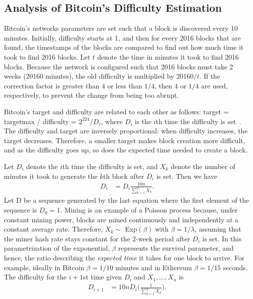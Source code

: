 \subsection{Analysis of Bitcoin's Difficulty Estimation}
 Bitcoin's networks parameters are set such that a block is discovered every 10 minutes. Initially, difficulty starts at 1, and then for every 2016 blocks that are found, the timestamps of the blocks are compared to find out how much time it took to find 2016 blocks. Let $t$ denote the time in minutes it took to find 2016 blocks. Because the network is configured such that 2016 blocks must take 2 weeks (20160 minutes), the old difficulty is multiplied by $20160 / t$. If the correction factor is greater than $4$ or less than $1/4$, then $4$ or $1/4$ are used, respectively, to prevent the change from being too abrupt.
\par \noindent Bitcoin's target and difficulty are related to each other as follows: target = targetmax / difficulty = $2^{224}/{D_i}$, where $D_i$ is the $i$th time the difficulty is set~\cite{bitcoin:difficulty}. The difficulty and target are inversely proportional: when difficulty increases, the target decreases. Therefore, a smaller target makes block creation more difficult, and as the difficulty goes up, so does the expected time needed to create a block.

Let $D_i$ denote the $i$th time the difficulty is set, and $X_k$ denote the number of minutes it took to generate the $k$th block after $D_i$ is set. Then we have
\begin{align}
D_{i} &=D_i \frac{10n}{ \sum_{k=1}^n X_k}.
\end{align}
Let D be a sequence generated by the last equation where the first element of the sequence is $D_0 = 1$. Mining is an example of a Poisson process because, under constant
mining power, blocks are mined continuously and independently at a
constant average rate.  Therefore, $X_k \sim$ Exp$(\beta)$ with $\beta = 1/\lambda$, assuming that the miner hash rate stays constant for the 2-week period after $D_i$ is set. In this parametrization of the exponential, $\beta$ represents the survival parameter, and hence, the ratio describing the {\em expected time} it takes for one block to arrive. For example, ideally in Bitcoin $\beta=1/10$ minutes and in Ethereum $\beta=1/15$ seconds. The difficulty for the $i+1$st time given $D_i$ and $X_1, \dots, X_n$ is
\begin{align}
D_{i+1} &= 10nD_i \Bigg(\frac{1}{\sum_{k=1}^{n} X_k}\Bigg).
\end{align}

